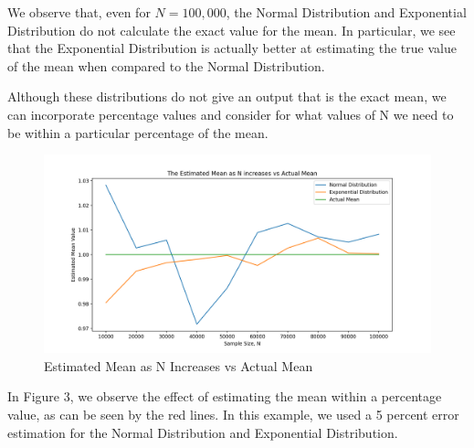 \documentclass[12pt]{article}
\begin{document}
We observe that, even for $N = 100,000$, the Normal Distribution and Exponential Distribution do not calculate the exact value for the mean. In particular, we see that the Exponential Distribution is actually better at estimating the true value of the mean when compared to the Normal Distribution. 

Although these distributions do not give an output that is the exact mean, we can incorporate percentage values and consider for what values of N we need to be within a particular percentage of the mean. 

\begin{figure}[h!]
  \includegraphics[scale=0.45, center]{Estimated Mean, 10,000 to 100,000}
  \caption{Estimated Mean as N Increases vs Actual Mean}
  \label{fig:estimated_mean}
\end{figure}

In Figure 3, we observe the effect of estimating the mean within a percentage value, as can be seen by the red lines. In this example, we used a 5 percent error estimation for the Normal Distribution and Exponential Distribution.
\end{document}
